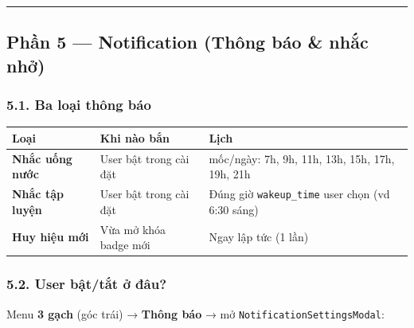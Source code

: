 \documentclass[12pt,a4paper]{article}
\newcounter{none}
\begin{document}
\begin{center}\rule{0.5\linewidth}{0.5pt}\end{center}

\subsection{Phần 5 --- Notification (Thông báo \& nhắc
nhở)}\label{phux1ea7n-5-notification-thuxf4ng-buxe1o-nhux1eafc-nhux1edf}

\subsubsection{5.1. Ba loại thông
báo}\label{ba-loux1ea1i-thuxf4ng-buxe1o}

{\def\LTcaptype{none} %
\begin{longtable}[]{@{}
  >{\raggedright\arraybackslash}p{}
  >{\raggedright\arraybackslash}p{}
  >{\raggedright\arraybackslash}p{}@{}}
\toprule\noalign{}
\begin{minipage}[b]{\linewidth}\raggedright
Loại
\end{minipage} & \begin{minipage}[b]{\linewidth}\raggedright
Khi nào bắn
\end{minipage} & \begin{minipage}[b]{\linewidth}\raggedright
Lịch
\end{minipage} \\
\midrule\noalign{}
\endhead
\bottomrule\noalign{}
\endlastfoot
\textbf{Nhắc uống nước} & User bật trong cài đặt & 8 mốc/ngày: 7h, 9h,
11h, 13h, 15h, 17h, 19h, 21h \\
\textbf{Nhắc tập luyện} & User bật trong cài đặt & Đúng giờ
\texttt{wakeup\_time} user chọn (vd 6:30 sáng) \\
\textbf{Huy hiệu mới} & Vừa mở khóa badge mới & Ngay lập tức (1 lần) \\
\end{longtable}
}

\subsubsection{5.2. User bật/tắt ở
đâu?}\label{user-bux1eadttux1eaft-ux1edf-ux111uxe2u}

Menu \textbf{3 gạch} (góc trái) → \textbf{Thông báo} → mở
\texttt{NotificationSettingsModal}:
\end{document}
